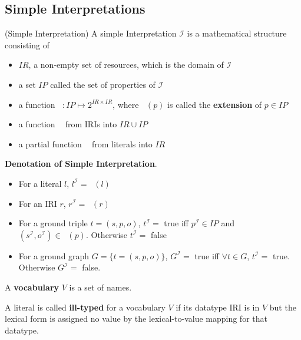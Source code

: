 \documentclass{article}
\DeclareMathOperator{\IEXT}{I_{EXT}}
\DeclareMathOperator{\IL}{I_{L}}
\DeclareMathOperator{\IS}{I_{S}}
\begin{document}
\subsection{Simple Interpretations}

\begin{defin}(Simple Interpretation)\newline
A simple Interpretation $\mathcal{I}$ is a mathematical structure consisting of
\begin{itemize}
\item $IR$, a non-empty set of resources, which is the domain of $\mathcal{I}$
\item a set $IP$ called the set of properties of $\mathcal{I}$
\item a function $\IEXT:IP \mapsto 2^{IR \times IR}$, where $\IEXT(p)$ is called the \textbf{extension} of $p \in IP$
\item a function $\IS$ from IRIs  into $IR \cup IP$
\item a partial function $\IL$ from literals into $IR$
\end{itemize}
\end{defin}

\noindent\textbf{Denotation of Simple Interpretation}.
\begin{itemize}
\item For a literal $l$, $l^{\mathcal{I}} = \IL(l)$
\item For an IRI $r$, $r^{\mathcal{I}} = \IS(r)$
\item For a ground triple $t = (s,p,o)$, $t^{\mathcal{I}} = $ true iff $p^{\mathcal{I}} \in IP$ and $(s^{\mathcal{I}}, o^{\mathcal{I}}) \in \IEXT(p)$. Otherwise $t^{\mathcal{I}} =  $ false
\item For a ground graph $G = \{t = (s,p,o)\}$, $G^{\mathcal{I}} = $ true iff $\forall t \in G$, $t^{\mathcal{I}} = $ true. Otherwise $G^{\mathcal{I}} = $ false.
\end{itemize}

\begin{defin}
A \textbf{vocabulary} $V$ is a set of names.
\end{defin}

\begin{defin}
A literal is called \textbf{ill-typed} for a vocabulary $V$ if its datatype IRI is in $V$ but the lexical form is assigned no value by the lexical-to-value mapping for that datatype.
\end{defin}
\end{document}
